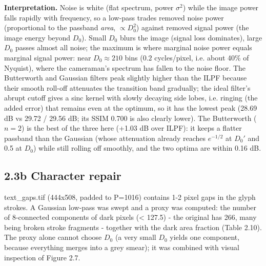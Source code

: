 \documentclass[10pt,a4paper]{article}
\begin{document}
\textbf{Interpretation.} Noise is white (flat spectrum, power $\sigma^2$) while the image power falls rapidly with frequency, so a low-pass trades removed noise power (proportional to the passband \textit{area}, $\propto D_0^2$) against removed signal power (the image energy beyond $D_0$). Small $D_0$ blurs the image (signal loss dominates), large $D_0$ passes almost all noise; the maximum is where marginal noise power equals marginal signal power: near $D_0\approx 210$ bins ($0.2$ cycles/pixel, i.e. about 40\% of Nyquist), where the cameraman's spectrum has fallen to the noise floor. The Butterworth and Gaussian filters peak slightly higher than the ILPF because their smooth roll-off attenuates the transition band gradually; the ideal filter's abrupt cutoff gives a sinc kernel with slowly decaying side lobes, i.e. ringing (the added error) that remains even at the optimum, so it has the lowest peak (28.69 dB vs 29.72 / 29.56 dB; its SSIM 0.700 is also clearly lower). The Butterworth ($n=2$) is the best of the three here (+1.03 dB over ILPF): it keeps a flatter passband than the Gaussian (whose attenuation already reaches $e^{-1/2}$ at $D_0'$ and 0.5 at $D_0$) while still rolling off smoothly, and the two optima are within 0.16 dB.

\subsection{2.3b Character repair}
text\_gaps.tif (444x508, padded to P=1016) contains 1-2 pixel gaps in the glyph strokes. A Gaussian low-pass was swept and a proxy was computed: the number of 8-connected components of dark pixels (\textless{} 127.5) - the original has 266, many being broken stroke fragments - together with the dark area fraction (Table 2.10). The proxy alone cannot choose $D_0$ (a very small $D_0$ yields one component, because everything merges into a grey smear); it was combined with visual inspection of Figure 2.7.
\end{document}
